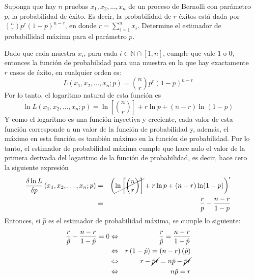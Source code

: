 \begin{enunciado}
 Suponga que hay $n$ pruebas $x_1, x_2, \ldots, x_n$ de un proceso de Bernolli con par\'ametro $p$, la probabilidad de \'exito. Es decir, la probabilidad de $r$ \'exitos est\'a dada por $\binom{n}{r}p^r(1-p)^{n-r}$, en donde $r = \sum_{i=1}^n x_i$. Determine el estimador de probabillidad m\'axima para el par\'ametro $p$.
\end{enunciado}

\begin{solucion}
 Dado que cada muestra $x_i$, para cada $i \in \mathbb{N}\cap [1,n]$, cumple que vale $1$ o $0$, entonces la funci\'on de probabilidad para una muestra en la que hay exactamente $r$ casos de \'exito, en cualquier orden es:
 \begin{equation*}
  L\left( x_1, x_2, \ldots, x_n; p \right) = \binom{n}{r}p^r(1-p)^{n-r}
 \end{equation*}
 Por lo tanto, el logaritmo natural de esta funci\'on es
 \begin{equation*}
  \ln  L\left( x_1, x_2, \ldots, x_n; p \right) = \ln \left[ \binom{n}{r} \right] + r\ln p + (n-r)\ln (1-p)
 \end{equation*}
 Y como el logaritmo es una funci\'on inyectiva y creciente, cada valor de esta funci\'on corresponde a un valor de la funci\'on de probabilidad y, adem\'as, el m\'aximo en esta funci\'on es tambi\'en m\'aximo en la funci\'on de probabilidad. Por lo tanto, el estimador de probabilidad m\'axima cumple que hace nulo el valor de la primera derivada del logaritmo de la funci\'on de probabilidad, es decir, hace cero la siguiente expresi\'on
 \begin{eqnarray*}
  \frac{\delta \ln L}{\delta p } \left( x_1, x_2, \ldots, x_n; p \right) & = & \left( \cancel{\ln \left[ \binom{n}{r} \right]} + r\ln p + (n-r)\ln (1-p) \right)' \\
  & = & \frac{r}{p} - \frac{n-r}{1-p}
 \end{eqnarray*}
 Entonces, si $\hat{p}$ es el estimador de probabilidad m\'axima, se cumple lo siguiente:
 \begin{eqnarray*}
  \frac{r}{\hat{p}} - \frac{n-r}{1-\hat{p}} = 0 & \Leftrightarrow & \frac{r}{\hat{p}} = \frac{n-r}{1-\hat{p}} \\
  & \Leftrightarrow & r\left(1-\hat{p} \right) = (n-r)\left(\hat{p} \right) \\
  & \Leftrightarrow & r - \cancel{\hat{p}r} = n\hat{p} - \cancel{\hat{p}r} \\
  & \Leftrightarrow & n\hat{p} = r \\

\end{eqnarray*}
\end{solucion}
